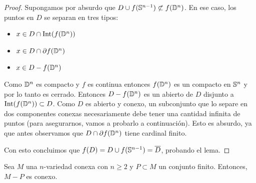 \begin{proof}

    Supongamos por absurdo que $D\cup f(\mathbb{S}^{n-1})\not\subset f(\mathbb{D}^n)$. En ese caso, los puntos en $D$ se separan en tres tipos:



    \begin{itemize}
        \item $x\in D\cap \text{Int}(f(\mathbb{D}^n))$
        \item $x\in D\cap \partial f(\mathbb{D}^n)$
        \item $x\in D - f(\mathbb{D}^n)$
    \end{itemize}

    Como $\mathbb{D}^n$ es compacto y $f$ es continua entonces $f(\mathbb{D}^n)$ es un compacto en $\mathbb{S}^n$ y por lo tanto es cerrado. Entonces $D - f(\mathbb{D}^n)$ es un abierto de $D$ disjunto a $\text{Int}(f(\mathbb{D}^n))\subset D$. Como $D$ es abierto y conexo, un subconjunto que lo separe en dos componentes conexas necesariamente debe tener una cantidad infinita de puntos (para asegurarnos, vamos a probarlo a continuación). Esto es absurdo, ya que antes observamos que $D\cap \partial f(\mathbb{D}^n)$ tiene cardinal finito.

    Con esto concluimos que $f(D)=D\cup f(\mathbb{S}^{n-1})=\overline{D}$, probando el lema.
\end{proof}

\begin{lema}\label{puntos separan}
    Sea $M$ una $n$-variedad conexa con $n\geq 2$ y $P\subset M$ un conjunto finito. Entonces, $M-P$ es conexo.
\end{lema}


